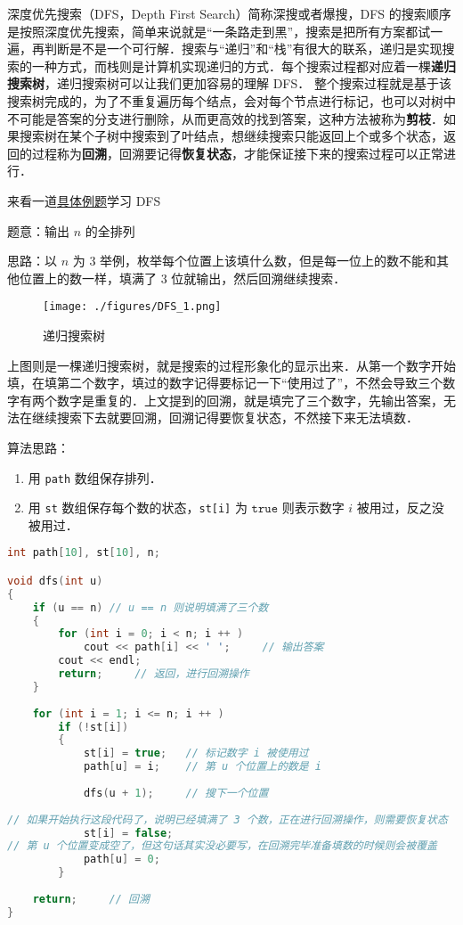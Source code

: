 
深度优先搜索（DFS，Depth First Search）简称深搜或者爆搜，DFS 的搜索顺序是按照深度优先搜索，简单来说就是“一条路走到黑”，搜索是把所有方案都试一遍，再判断是不是一个可行解．搜索与“递归”和“栈”有很大的联系，递归是实现搜索的一种方式，而栈则是计算机实现递归的方式．每个搜索过程都对应着一棵\textbf{递归搜索树}，递归搜索树可以让我们更加容易的理解 DFS．
整个搜索过程就是基于该搜索树完成的，为了不重复遍历每个结点，会对每个节点进行标记，也可以对树中不可能是答案的分支进行删除，从而更高效的找到答案，这种方法被称为\textbf{剪枝}．如果搜索树在某个子树中搜索到了叶结点，想继续搜索只能返回上个或多个状态，返回的过程称为\textbf{回溯}，回溯要记得\textbf{恢复状态}，才能保证接下来的搜索过程可以正常进行．

来看一道\href{https://www.luogu.com.cn/problem/P1706}{具体例题}学习 DFS

题意：输出 $n$ 的全排列

思路：以 $n$ 为 $3$ 举例，枚举每个位置上该填什么数，但是每一位上的数不能和其他位置上的数一样，填满了 $3$ 位就输出，然后回溯继续搜索．

\begin{figure}[ht]
\centering
\texttt{[image: ./figures/DFS\_1.png]}
\caption{递归搜索树} \label{DFS_fig1}
\end{figure}

上图则是一棵递归搜索树，就是搜索的过程形象化的显示出来．从第一个数字开始填，在填第二个数字，填过的数字记得要标记一下“使用过了”，不然会导致三个数字有两个数字是重复的．上文提到的回溯，就是填完了三个数字，先输出答案，无法在继续搜索下去就要回溯，回溯记得要恢复状态，不然接下来无法填数．

算法思路：
\begin{enumerate}
\item 用 \verb|path| 数组保存排列．

\item 用 \verb|st| 数组保存每个数的状态，\verb|st[i]| 为 $\mathtt{true}$ 则表示数字 $i$ 被用过，反之没被用过．

\end{enumerate}
\begin{lstlisting}[language=cpp]
int path[10], st[10], n;

void dfs(int u)
{
    if (u == n) // u == n 则说明填满了三个数
    {
        for (int i = 0; i < n; i ++ )
            cout << path[i] << ' ';     // 输出答案
        cout << endl;
        return;     // 返回，进行回溯操作
    }
    
    for (int i = 1; i <= n; i ++ )
        if (!st[i])
        {
            st[i] = true;   // 标记数字 i 被使用过
            path[u] = i;    // 第 u 个位置上的数是 i
            
            dfs(u + 1);     // 搜下一个位置
            
// 如果开始执行这段代码了，说明已经填满了 3 个数，正在进行回溯操作，则需要恢复状态
            st[i] = false;  
// 第 u 个位置变成空了，但这句话其实没必要写，在回溯完毕准备填数的时候则会被覆盖
            path[u] = 0;    
        }
        
    return;     // 回溯
}
\end{lstlisting}